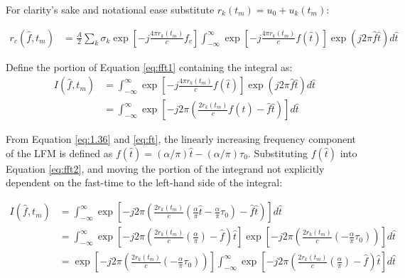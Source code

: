 \documentclass[fleqn,10pt]{olplainarticle}
\begin{document}
\noindent For clarity's sake and notational ease substitute $r_{k}(t_{m}) = u_{0} + u_{k}(t_{m})$:

\begin{equation}
\begin{aligned}
    r_{c}(\hat{f}, t_{m})
    &= \frac{A}{2} \sum_{k}\sigma_{k} \exp \left[ -j \frac{4\pi r_{k}(t_m)}{c} f_{c}\right]\int_{-\infty}^{\infty} 
    \exp \left[ -j \frac{4\pi r_{k}(t_{m})}{c} f(\hat{t})\right]
    \exp(j 2 \pi \hat{f}\hat{t}) d\hat{t}
\end{aligned}
\label{eq:fft1}
\end{equation}

\noindent Define the portion of Equation \ref{eq:fft1} containing the integral as:
\begin{equation}
    \begin{aligned}
        I(\hat{f}, t_{m})
        &= \int_{-\infty}^{\infty} 
        \exp \left[ -j \frac{4\pi r_{k}(t_{m})}{c} f(\hat{t})\right]
        \exp(j 2 \pi \hat{f}\hat{t}) d\hat{t}\\
        &= \int_{-\infty}^{\infty} 
        \exp \left[ -j 2\pi \left( \frac{2 r_{k}(t_{m})}{c} f(\hat{t}) - \hat{f}\hat{t} \right)\right]
         d\hat{t}
    \end{aligned}
    \label{eq:fft2}
\end{equation}

\noindent From Equation \ref{eq:1.36} and \ref{eq:ft}, the linearly increasing frequency component of the LFM is defined as $f(\hat{t}) = (\alpha/\pi) \hat{t} - (\alpha/\pi) \tau_{0}$. Substituting $f(\hat{t})$ into Equation \ref{eq:fft2}, and moving the portion of the integrand not explicitly dependent on the fast-time to the left-hand side of the integral:

\begin{equation}
    \begin{aligned}
        I(\hat{f}, t_{m})
        &= \int_{-\infty}^{\infty} 
        \exp \left[ -j 2\pi \left( \frac{2 r_{k}(t_{m})}{c} \left( \frac{\alpha}{\pi} \hat{t} - \frac{\alpha}{\pi}\tau_{0} \right) - \hat{f}\hat{t} \right)\right]
         d\hat{t}\\
         &= \int_{-\infty}^{\infty} 
        \exp \left[ -j 2\pi \left( \frac{2 r_{k}(t_{m})}{c} \left( \frac{\alpha}{\pi} \right) - \hat{f} \right)\hat{t}\right]
        \exp \left[ -j 2\pi \left( \frac{2 r_{k}(t_{m})}{c} \left( - \frac{\alpha}{\pi}\tau_{0} \right) \right)\right]
         d\hat{t}\\
         &= \exp \left[ -j 2\pi \left( \frac{2 r_{k}(t_{m})}{c} \left( - \frac{\alpha}{\pi}\tau_{0} \right) \right)\right] \int_{-\infty}^{\infty} 
        \exp \left[ -j 2\pi \left( \frac{2 r_{k}(t_{m})}{c} \left( \frac{\alpha}{\pi} \right) - \hat{f} \right)\hat{t}\right]
         d\hat{t}
    \end{aligned}
    \label{eq:fft3}
\end{equation}
\end{document}
